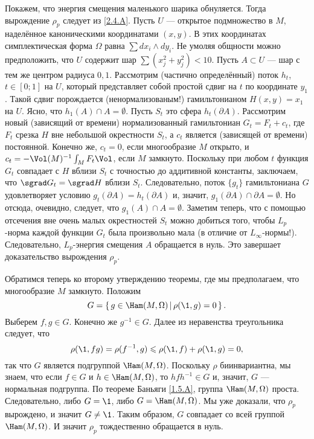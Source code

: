 Покажем, что энергия смещения маленького шарика обнуляется.
Тогда вырождение $\rho_p$ следует из \ref{2.4.A}.
Пусть $U$ --- открытое подмножество в $M$, наделённое каноническими координатами $(x, y)$.
В этих координатах симплектическая форма $\Omega$ равна $\sum dx_i\wedge dy_i$.
Не умоляя общности можно предположить, что $U$ содержит шар $\sum(x^2_j + y_j^2) <10$.
Пусть $A \subset U$ --- шар с тем же центром радиуса $0{,}1$.
Рассмотрим (частично определённый) поток $h_t$, $t \in [0; 1]$ на $U$, который представляет собой простой сдвиг на $t$ по координате $y_1$.
Такой сдвиг порождается (ненормализованым!) гамильтонианом $H (x, y) = x_1$ на $U$.
Ясно, что $h_1 (A) \cap A = \emptyset$.
Пусть $S_t$ это сфера $h_t (\partial A)$.
Рассмотрим новый (зависящий от времени) нормализованный гамильтониан
$G_t = F_t + c_t$, где $F_t$ срезка $H$ вне небольшой окрестности $S_t$, а $c_t$ является (зависящей от времени) постоянной.
Конечно же, $c_t = 0$, если многообразие $M$ открыто, и $c_t = -\Vol(M)^{-1}\int_M F_t \Vol$, если $M$ замкнуто.
Поскольку при любом $t$ функция $G_t$ совпадает с $H$ вблизи $S_t$ с точностью до аддитивной константы, заключаем, что $\sgrad G_t = \sgrad H$ вблизи $S_t$.
Следовательно, поток $\{g_t\}$ гамильтониана $G$ удовлетворяет условию $g_t (\partial A) = h_t (\partial A)$ и, значит, $g_1 (\partial A) \cap \partial A = \emptyset$.
Но отсюда, очевидно, следует, что $g_1 (A) \cap A = \emptyset$.
Заметим теперь, что с помощью отсечения вне очень малых окрестностей $S_t$ можно добиться того, чтобы $L_p$-норма каждой функции $G_t$ была произвольно мала (в отличие от $L_\infty$-нормы!).
Следовательно, $L_p$-энергия смещения $A$ обращается в нуль.
Это завершает доказательство вырождения $\rho_p$.

Обратимся теперь ко второму утверждению теоремы, где мы предполагаем, что многообразие $M$ замкнуто.
Положим
\[G = \set{g \in \Ham (M, \Omega)}{\rho (\1, g) = 0}.\]
Выберем $f, g \in G$.
Конечно же $g^{-1} \in G$.
Далее из неравенства треугольника следует, что 
\[\rho (\1, f g) = \rho (f^{-1}, g) \le \rho (\1, f) + \rho (\1, g) = 0,\]
так что $G$ является подгруппой $\Ham (M, \Omega)$.
Поскольку $\rho$ биинвариантна, мы знаем, что если $f \in G$ и $h \in \Ham (M, \Omega)$, то $hf h^{-1} \in G$ и, значит, $G$ --- нормальная подгруппа.
По теореме Баньяги \ref{1.5.A}, группа $\Ham (M, \Omega)$ проста.
Следовательно, либо $G = {\1}$, либо $G = \Ham (M, \Omega)$.
Мы уже доказали, что $\rho_p$ вырождено, и значит $G \ne {\1}$.
Таким образом, $G$ совпадает со всей группой $\Ham (M, \Omega)$.
И значит $\rho_p$ тождественно обращается в нуль.
\qeds


